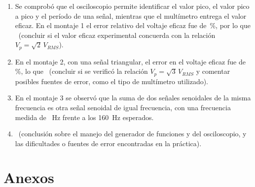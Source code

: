 \documentclass{article}
\newcommand{\vacio}[1][2cm]{\underline{\hspace{#1}}}
\newcommand{\figpend}{figura~\textbf{[N.º pendiente]}}
\begin{document}
    \begin{enumerate}
        \item Se comprobó que el osciloscopio permite identificar el valor pico, el valor pico a pico y el período de una señal, mientras que el multímetro entrega el valor eficaz. En el montaje 1 el error relativo del voltaje eficaz fue de \vacio\,\%, por lo que \vacio\ (concluir si el valor eficaz experimental concuerda con la relación $V_p = \sqrt{2}\,V_{RMS}$).

        \item En el montaje 2, con una señal triangular, el error en el voltaje eficaz fue de \vacio\,\%, lo que \vacio\ (concluir si se verificó la relación $V_p = \sqrt{3}\,V_{RMS}$ y comentar posibles fuentes de error, como el tipo de multímetro utilizado).

        \item En el montaje 3 se observó que la suma de dos señales senoidales de la misma frecuencia es otra señal senoidal de igual frecuencia, con una frecuencia medida de \vacio\ \si{\hertz} frente a los \SI{160}{\hertz} esperados.

        \item \vacio\ (conclusión sobre el manejo del generador de funciones y del osciloscopio, y las dificultades o fuentes de error encontradas en la práctica).
    \end{enumerate}

    \newpage
    \section{Anexos}



\end{document}

